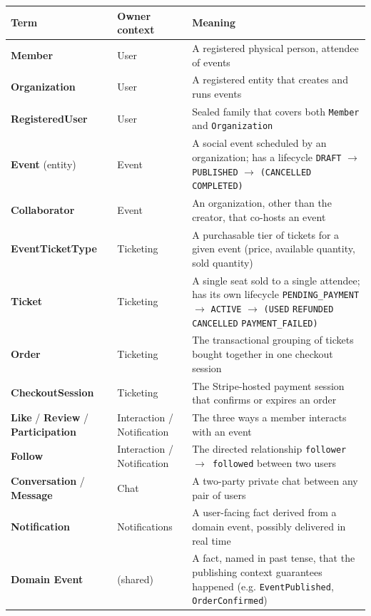 \begin{longtable}{|L{3.6cm}|L{2.4cm}|L{8.7cm}|}
\hline
\textbf{Term} & \textbf{Owner context} & \textbf{Meaning} \\
\hline
\endhead
\textbf{Member} & User & A registered physical person, attendee of events \\
\hline
\textbf{Organization} & User & A registered entity that creates and runs events \\
\hline
\textbf{RegisteredUser} & User & Sealed family that covers both \texttt{Member} and \texttt{Organization} \\
\hline
\textbf{Event} (entity) & Event & A social event scheduled by an organization; has a lifecycle \texttt{DRAFT} $\rightarrow$ \texttt{PUBLISHED} $\rightarrow$ \texttt{(CANCELLED} \textbar{} \texttt{COMPLETED)} \\
\hline
\textbf{Collaborator} & Event & An organization, other than the creator, that co-hosts an event \\
\hline
\textbf{EventTicketType} & Ticketing & A purchasable tier of tickets for a given event (price, available quantity, sold quantity) \\
\hline
\textbf{Ticket} & Ticketing & A single seat sold to a single attendee; has its own lifecycle \texttt{PENDING\_PAYMENT} $\rightarrow$ \texttt{ACTIVE} $\rightarrow$ \texttt{(USED} \textbar{} \texttt{REFUNDED} \textbar{} \texttt{CANCELLED} \textbar{} \texttt{PAYMENT\_FAILED)} \\
\hline
\textbf{Order} & Ticketing & The transactional grouping of tickets bought together in one checkout session \\
\hline
\textbf{CheckoutSession} & Ticketing & The Stripe-hosted payment session that confirms or expires an order \\
\hline
\textbf{Like} / \textbf{Review} / \textbf{Participation} & Interaction / Notification & The three ways a member interacts with an event \\
\hline
\textbf{Follow} & Interaction / Notification & The directed relationship \texttt{follower $\rightarrow$ followed} between two users \\
\hline
\textbf{Conversation} / \textbf{Message} & Chat & A two-party private chat between any pair of users \\
\hline
\textbf{Notification} & Notifications & A user-facing fact derived from a domain event, possibly delivered in real time \\
\hline
\textbf{Domain Event} & (shared) & A fact, named in past tense, that the publishing context guarantees happened (e.g. \texttt{EventPublished}, \texttt{OrderConfirmed}) \\
\hline
\end{longtable}


